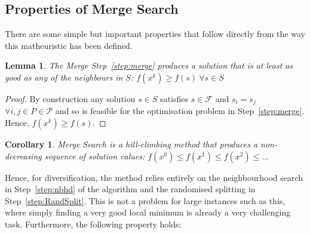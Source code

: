 \documentclass[authoryear,11pt,square,number,times,super,comma]{elsarticle}
\newtheorem{corollary}{Corollary}
\newtheorem{lemma}{Lemma}
\begin{document}
\subsection{Properties of Merge Search}
There are some simple but important properties that follow directly from the way this matheuristic has been defined.

\begin{lemma}\label{thm:improve}
  The Merge Step~\ref{step:merge} produces a solution that is at least as good
  as any of the neighbours in $S$: $f(x^k) \ge f(s)\ \forall s\in S$
\end{lemma}
\begin{proof}
  By construction any solution $s\in S$ satisfies $s\in \mathcal{F}$ and
  $s_i=s_j$ $\forall i,j\in P\in\mathcal{P}$ and so is feasible for the
  optimisation problem in Step~\ref{step:merge}. Hence, $f(x^k)\ge f(s)$.
\end{proof}

\begin{corollary}\label{thm:hill-climb}
  Merge Search is a hill-climbing method that produces a non-decreasing sequence
 of solution values: $f(x^0)\le f(x^1)\le f(x^2)\le \ldots$
\end{corollary}

Hence, for diversification, the method relies entirely on the neighbourhood
search in Step~\ref{step:nbhd} of the algorithm and the randomised splitting in
Step~\ref{step:RandSplit}. This is not a problem for large instances such as
this, where simply finding a very good local minimum is already a very
challenging task. Furthermore, the following property holds:
\end{document}
